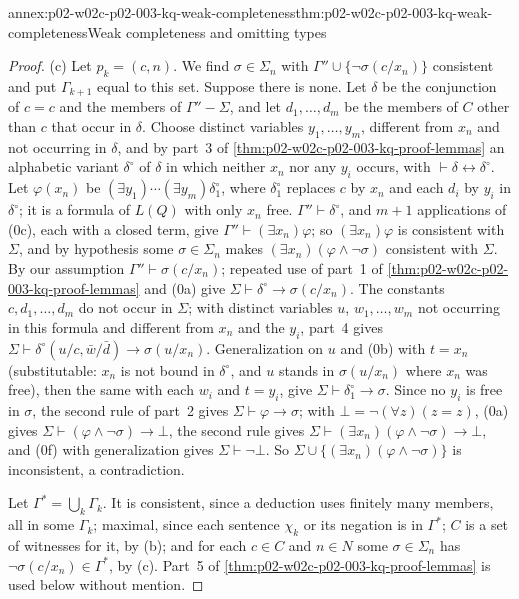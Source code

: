 \begin{annexitem}{annex:p02-w02c-p02-003-kq-weak-completeness}{thm:p02-w02c-p02-003-kq-weak-completeness}{Weak completeness and omitting types}
\begin{proof}
(c) Let \(p_k=(c,n)\).  We find \(\sigma\in\Sigma_n\) with
\(\Gamma''\cup\{\neg\sigma(c/x_n)\}\) consistent and put \(\Gamma_{k+1}\)
equal to this set.  Suppose there is none.  Let \(\delta\) be the
conjunction of \(c=c\) and the members of \(\Gamma''-\Sigma\), and let
\(d_1,\ldots,d_m\) be the members of \(C\) other than \(c\) that occur in
\(\delta\).  Choose distinct variables \(y_1,\ldots,y_m\), different from
\(x_n\) and not occurring in \(\delta\), and by part~3 of
\cref{thm:p02-w02c-p02-003-kq-proof-lemmas} an alphabetic variant
\(\delta^{\circ}\) of \(\delta\) in which neither \(x_n\) nor any \(y_i\)
occurs, with \(\vdash\delta\leftrightarrow\delta^{\circ}\).  Let
\(\varphi(x_n)\) be \((\exists y_1)\cdots(\exists y_m)\delta^{\circ}_1\),
where \(\delta^{\circ}_1\) replaces \(c\) by \(x_n\) and each \(d_i\) by
\(y_i\) in \(\delta^{\circ}\); it is a formula of \(L(Q)\) with only \(x_n\)
free.  \(\Gamma''\vdash\delta^{\circ}\), and \(m+1\) applications of (0c),
each with a closed term, give \(\Gamma''\vdash(\exists x_n)\varphi\); so
\((\exists x_n)\varphi\) is consistent with \(\Sigma\), and by hypothesis
some \(\sigma\in\Sigma_n\) makes \((\exists x_n)(\varphi\land\neg\sigma)\)
consistent with \(\Sigma\).  By our assumption \(\Gamma''\vdash\sigma(c/x_n)\);
repeated use of part~1 of \cref{thm:p02-w02c-p02-003-kq-proof-lemmas} and
(0a) give \(\Sigma\vdash\delta^{\circ}\to\sigma(c/x_n)\).  The constants
\(c,d_1,\ldots,d_m\) do not occur in \(\Sigma\); with distinct variables \(u\),
\(w_1,\ldots,w_m\) not occurring in this formula and different from \(x_n\)
and the \(y_i\), part~4 gives
\(\Sigma\vdash\delta^{\circ}(u/c,\bar w/\bar d)\to\sigma(u/x_n)\).
Generalization on \(u\) and (0b) with \(t=x_n\) (substitutable: \(x_n\) is
not bound in \(\delta^{\circ}\), and \(u\) stands in \(\sigma(u/x_n)\) where
\(x_n\) was free), then the same with each \(w_i\) and \(t=y_i\), give
\(\Sigma\vdash\delta^{\circ}_1\to\sigma\).  Since no \(y_i\) is free in
\(\sigma\), the second rule of part~2 gives \(\Sigma\vdash\varphi\to\sigma\);
with \(\bot=\neg(\forall z)(z=z)\), (0a) gives
\(\Sigma\vdash(\varphi\land\neg\sigma)\to\bot\), the second rule gives
\(\Sigma\vdash(\exists x_n)(\varphi\land\neg\sigma)\to\bot\), and (0f) with
generalization gives \(\Sigma\vdash\neg\bot\).  So
\(\Sigma\cup\{(\exists x_n)(\varphi\land\neg\sigma)\}\) is inconsistent, a
contradiction.

Let \(\Gamma^{*}=\bigcup_k\Gamma_k\).  It is consistent, since a deduction
uses finitely many members, all in some \(\Gamma_k\); maximal, since each
sentence \(\chi_k\) or its negation is in \(\Gamma^{*}\); \(C\) is a set of
witnesses for it, by (b); and for each \(c\in C\) and \(n\in N\) some
\(\sigma\in\Sigma_n\) has \(\neg\sigma(c/x_n)\in\Gamma^{*}\), by (c).  Part~5
of \cref{thm:p02-w02c-p02-003-kq-proof-lemmas} is used below without
mention.


\end{proof}
\end{annexitem}
